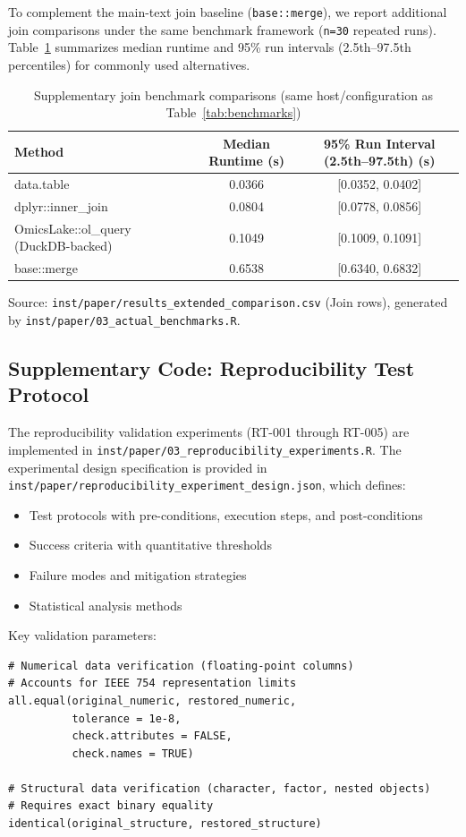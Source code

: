 \documentclass[11pt,a4paper]{article}
\begin{document}
To complement the main-text join baseline (\texttt{base::merge}), we report additional join comparisons under the same benchmark framework (\texttt{n=30} repeated runs). Table~\ref{tab:s3_join} summarizes median runtime and 95\% run intervals (2.5th--97.5th percentiles) for commonly used alternatives.

\begin{table}[H]
\centering
\caption{Supplementary join benchmark comparisons (same host/configuration as Table~\ref{tab:benchmarks})}
\label{tab:s3_join}
\begin{tabular}{lcc}
\toprule
\textbf{Method} & \textbf{Median Runtime (s)} & \textbf{95\% Run Interval (2.5th--97.5th) (s)} \\
\midrule
data.table & 0.0366 & [0.0352, 0.0402] \\
dplyr::inner\_join & 0.0804 & [0.0778, 0.0856] \\
OmicsLake::ol\_query (DuckDB-backed) & 0.1049 & [0.1009, 0.1091] \\
base::merge & 0.6538 & [0.6340, 0.6832] \\
\bottomrule
\end{tabular}
\end{table}

\noindent Source: \texttt{inst/paper/results\_extended\_comparison.csv} (Join rows), generated by \texttt{inst/paper/03\_actual\_benchmarks.R}.

\subsection{Supplementary Code: Reproducibility Test Protocol}

The reproducibility validation experiments (RT-001 through RT-005) are implemented in \texttt{inst/paper/03\_reproducibility\_experiments.R}. The experimental design specification is provided in \texttt{inst/paper/reproducibility\_experiment\_design.json}, which defines:

\begin{itemize}
    \item Test protocols with pre-conditions, execution steps, and post-conditions
    \item Success criteria with quantitative thresholds
    \item Failure modes and mitigation strategies
    \item Statistical analysis methods
\end{itemize}

Key validation parameters:
\begin{lstlisting}
# Numerical data verification (floating-point columns)
# Accounts for IEEE 754 representation limits
all.equal(original_numeric, restored_numeric,
          tolerance = 1e-8,
          check.attributes = FALSE,
          check.names = TRUE)

# Structural data verification (character, factor, nested objects)
# Requires exact binary equality
identical(original_structure, restored_structure)
\end{lstlisting}
\end{document}

